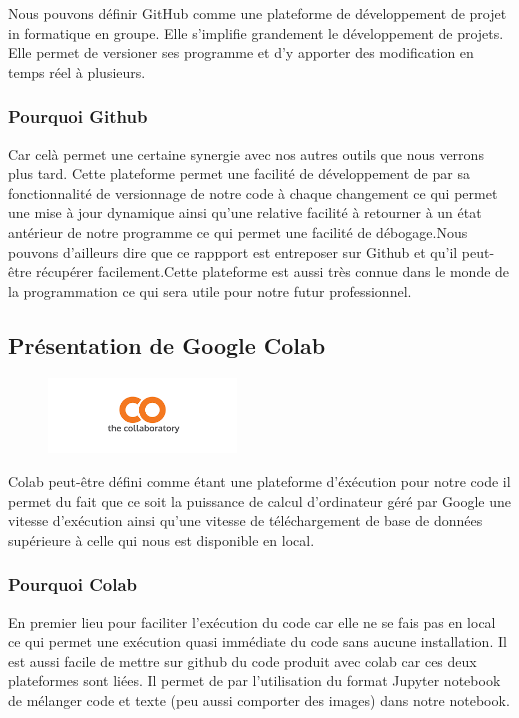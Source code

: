 Nous pouvons définir GitHub comme une plateforme de développement de projet in formatique en groupe. Elle s'implifie grandement le développement de projets. Elle permet de versioner ses programme et d'y apporter des modification en temps réel à plusieurs.

\hypertarget{Pourquoi-Github}{%
\subsubsection{Pourquoi Github}
\label{Pourquoi-Github}}
Car celà permet une certaine synergie avec nos autres outils que nous verrons plus tard. Cette plateforme permet une facilité de développement de par sa fonctionnalité de versionnage de notre code à chaque changement ce qui permet une mise à jour dynamique ainsi qu'une relative facilité à retourner à un état antérieur de notre programme ce qui permet une facilité de débogage.Nous pouvons d'ailleurs dire que ce rappport est entreposer sur Github et qu'il peut-être récupérer facilement.Cette plateforme est aussi très connue dans le monde de la programmation ce qui sera utile pour notre futur professionnel.

\hypertarget{Pruxe9sentation-de-Google-Colab}{%
\subsection{Présentation de Google Colab}
\label{Pruxe9sentation-de-Google-Colab}}

\begin{figure}[h]
\begin{center}
\includegraphics[width=5cm]{./images/Colab_logo.png}
\end{center}
\end{figure}

Colab peut-être défini comme étant une plateforme d'éxécution pour notre code
il permet du fait que ce soit la puissance de calcul d'ordinateur géré par Google une vitesse d'exécution ainsi qu'une vitesse de téléchargement de base de données supérieure à celle qui nous est disponible en local.

\hypertarget{Pourquoi-Colab}{%
\subsubsection{Pourquoi Colab}
\label{Pourquoi-Colab}}
En premier lieu pour faciliter l'exécution du code car elle ne se fais pas en local ce qui permet une exécution quasi immédiate du code sans aucune installation. Il est aussi facile de mettre sur github du code produit avec colab car ces deux plateformes sont liées. Il permet de par l'utilisation du format Jupyter notebook de mélanger code et texte (peu aussi comporter des images) dans notre notebook.

